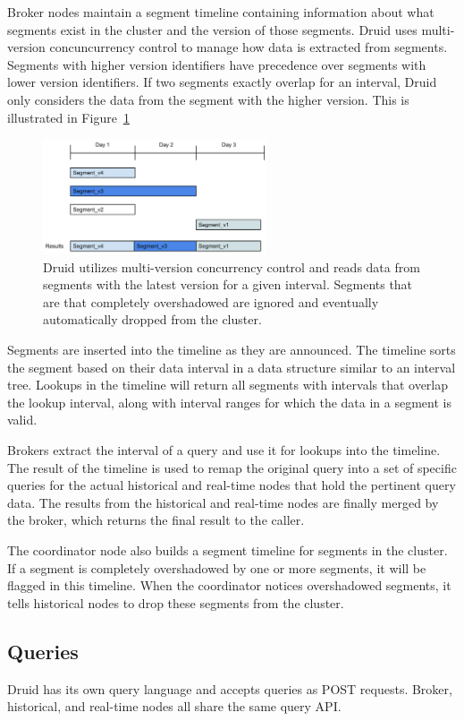 \documentclass{vldb}
\begin{document}
Broker nodes maintain a segment timeline containing information about what
segments exist in the cluster and the version of those segments. Druid uses
multi-version concuncurrency control to manage how data is extracted from
segments. Segments with higher version identifiers have precedence over
segments with lower version identifiers. If two segments exactly overlap for an
interval, Druid only considers the data from the segment with the higher
version. This is illustrated in Figure~\ref{fig:timeline}

\begin{figure}
\centering
\includegraphics[width = 2.6in]{timeline}
\caption{
Druid utilizes multi-version concurrency control and reads data from segments
with the latest version for a given interval. Segments that are that completely
overshadowed are ignored and eventually automatically dropped from the cluster.
}
\label{fig:timeline}
\end{figure}

Segments are inserted into the timeline as they are announced. The timeline
sorts the segment based on their data interval in a data structure similar to
an interval tree. Lookups in the timeline will return all segments with
intervals that overlap the lookup interval, along with interval ranges for
which the data in a segment is valid. 

Brokers extract the interval of a query and use it for lookups into the
timeline. The result of the timeline is used to remap the original query into a
set of specific queries for the actual historical and real-time nodes that hold
the pertinent query data. The results from the historical and real-time nodes
are finally merged by the broker, which returns the final result to the caller.

The coordinator node also builds a segment timeline for segments in the
cluster. If a segment is completely overshadowed by one or more segments, it
will be flagged in this timeline. When the coordinator notices overshadowed
segments, it tells historical nodes to drop these segments from the cluster.

\subsection{Queries}
Druid has its own query language and accepts queries as POST requests. Broker,
historical, and real-time nodes all share the same query API. 
\end{document}
